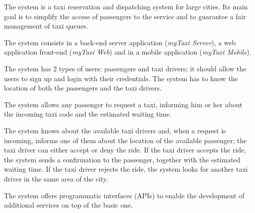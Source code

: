 The system is a taxi reservation and dispatching system for large cities. Its main goal is to simplify the access of passengers to the service and to guarantee a fair management of taxi queues.

The system consists in a back-end server application (\emph{myTaxi Server}), a web application front-end (\emph{myTaxi Web}) and in a mobile application (\emph{myTaxi Mobile}).

The system has 2 types of users: passengers and taxi drivers; it should allow the users to sign up and login with their credentials.
The system has to know the location of both the passengers and the taxi drivers.

The system allows any passenger to request a taxi, informing him or her about the incoming taxi code and the estimated waiting time.

The system knows about the available taxi drivers and, when a request is incoming, informs one of them about the location of the available passenger; the taxi driver can either accept or deny the ride.
If the taxi driver accepts the ride, the system sends a confirmation to the passenger, together with the estimated waiting time.
If the taxi driver rejects the ride, the system looks for another taxi driver in the same area of the city.

The system offers programmatic interfaces (APIs) to enable the development of additional services on top of the basic one.

